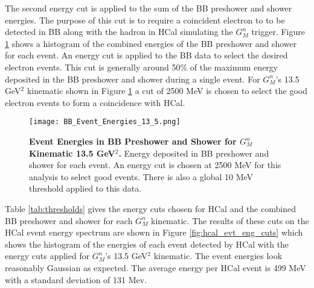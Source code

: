 \documentclass[10pt]{article}
\begin{document}
The second energy cut is applied to the sum of the BB preshower and shower energies. The purpose of this cut is to require a coincident electron to to be detected in BB along with the hadron in HCal simulating the $G_M^n$ trigger. Figure \ref{fig:bb_evt_eng} shows a histogram of the combined energies of the BB preshower and shower for each event. An energy cut is applied to the BB data to select the desired electron events. This cut is generally around 50\% of the maximum energy deposited in the BB preshower and shower during a single event. For $G_M^n$'s 13.5 GeV$^2$ kinematic shown in Figure \ref{fig:bb_evt_eng} a cut of 2500 MeV is chosen to select the good electron events to form a coincidence with HCal.\\

	\begin{figure}[!ht]
	\begin{center}
	\texttt{[image: BB\_Event\_Energies\_13\_5.png]}
	\end{center}
	\caption{
	{\bf{Event Energies in BB Preshower and Shower for $G_M^n$ Kinematic 13.5 GeV$^2$.}} Energy deposited in BB preshower and shower for each event. An energy cut is chosen at 2500 MeV for this analysis to select good events. There is also a global 10 MeV threshold applied to this data.}
	\label{fig:bb_evt_eng}
	\end{figure}

Table \ref{tab:thresholds} gives the energy cuts chosen for HCal and the combined BB preshower and shower for each $G_M^n$ kinematic. The results of these cuts on the HCal event energy spectrum are shown in Figure \ref{fig:hcal_evt_eng_cuts} which shows the histogram of the energies of each event detected by HCal with the energy cuts applied for $G_M^n$'s 13.5 GeV$^2$ kinematic. The event energies look reasonably Gaussian as expected. The average energy per HCal event is 499 MeV with a standard deviation of 131 Mev. \\
	
\end{document}
